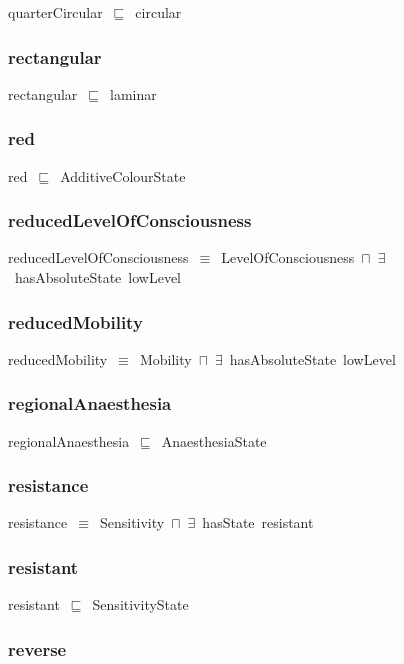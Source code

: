 \documentclass{article}
\begin{document}
quarterCircular~\ensuremath{\sqsubseteq}~circular~

\subsubsection*{rectangular}

rectangular~\ensuremath{\sqsubseteq}~laminar~

\subsubsection*{red}

red~\ensuremath{\sqsubseteq}~AdditiveColourState~

\subsubsection*{reducedLevelOfConsciousness}

reducedLevelOfConsciousness~\ensuremath{\equiv}~LevelOfConsciousness~\ensuremath{\sqcap}~\ensuremath{\exists}~hasAbsoluteState~lowLevel

\subsubsection*{reducedMobility}

reducedMobility~\ensuremath{\equiv}~Mobility~\ensuremath{\sqcap}~\ensuremath{\exists}~hasAbsoluteState~lowLevel

\subsubsection*{regionalAnaesthesia}

regionalAnaesthesia~\ensuremath{\sqsubseteq}~AnaesthesiaState~

\subsubsection*{resistance}

resistance~\ensuremath{\equiv}~Sensitivity~\ensuremath{\sqcap}~\ensuremath{\exists}~hasState~resistant

\subsubsection*{resistant}

resistant~\ensuremath{\sqsubseteq}~SensitivityState~

\subsubsection*{reverse}
\end{document}
